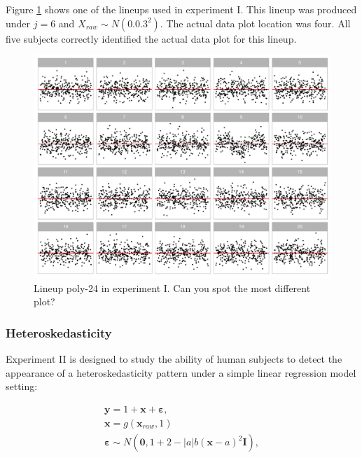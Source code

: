 \documentclass[]{interact}
\theoremstyle{plain}%
\theoremstyle{definition}
\theoremstyle{remark}
\begin{document}
Figure \ref{fig:example-poly-lineup} shows one of the lineups used in
experiment I. This lineup was produced under \(j = 6\) and
\(X_{raw} \sim N(0.0.3^2)\). The actual data plot location was four. All
five subjects correctly identified the actual data plot for this lineup.

\begin{figure}

{\centering \includegraphics[width=1\linewidth]{paper_comparison_files/figure-latex/example-poly-lineup-1} 

}

\caption{Lineup poly-24 in experiment I. Can you spot the most different plot? \label{fig:example-poly-lineup}}\label{fig:example-poly-lineup}
\end{figure}

\hypertarget{heteroskedasticity}{%
\subsubsection{Heteroskedasticity}\label{heteroskedasticity}}

Experiment II is designed to study the ability of human subjects to
detect the appearance of a heteroskedasticity pattern under a simple
linear regression model setting:

\begin{align} \label{eq:heter-model}
\boldsymbol{y} = 1 + \boldsymbol{x} + \boldsymbol{\varepsilon},\\
\boldsymbol{x} = g(\boldsymbol{x}_{raw}, 1)\\
\boldsymbol{\varepsilon} \sim N(\boldsymbol{0}, 1 + 2 - |a| b (\boldsymbol{x} - a)^2 \boldsymbol{I}), \\
\end{align}
\end{document}
